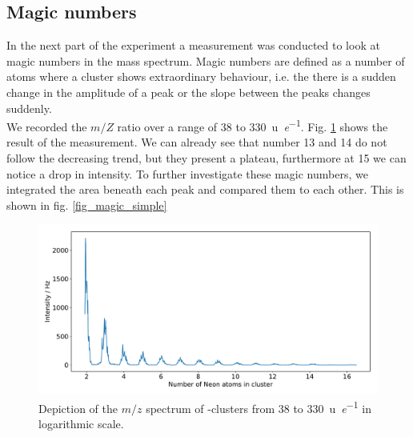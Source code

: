 \documentclass[a4paper,10pt]{article}
\begin{document}
\subsection{Magic numbers}
In the next part of the experiment a measurement was conducted to look at magic numbers in the mass spectrum. Magic numbers are defined as a number of atoms where a cluster shows extraordinary behaviour, i.e. the there is a sudden change in the amplitude of a peak or the slope between the peaks changes suddenly. \\
We recorded the $m/Z$ ratio over a range of \SI{38}{} to \SI{330}{\atomicmassunit \per \elementarycharge}. Fig. \ref{fig_magic_peak} shows the result of the measurement. We can already see that number 13 and 14 do not follow the decreasing trend, but they present a plateau, furthermore at 15 we can notice a drop in intensity. To further investigate these magic numbers, we integrated the area beneath each peak and compared them to each other. This is shown in fig. \ref{fig_magic_simple}

\begin{figure}[H]
	\centering
	\includegraphics[width = 0.8 \textwidth]{magic_peaks}
	\caption{Depiction of the $m/z$ spectrum of -clusters from \SI{38}{} to \SI{330}{\atomicmassunit \per \elementarycharge} in logarithmic scale.}
	\label{fig_magic_peak}
\end{figure}
\end{document}
